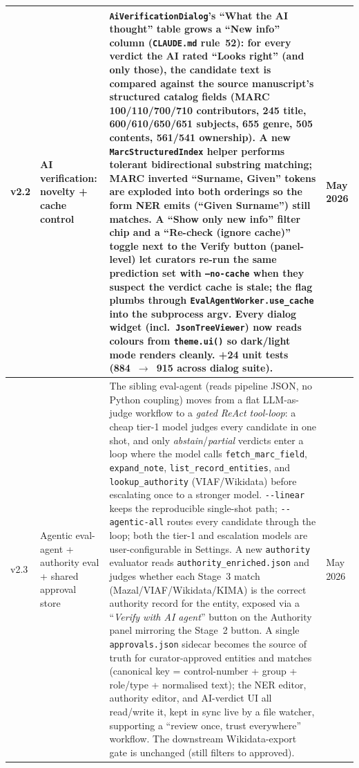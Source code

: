 \documentclass[12pt]{article}
\newcommand{\filepath}[1]{\texttt{\small #1}}
\newcommand{\code}[1]{\texttt{#1}}
\begin{document}
\begin{longtable}{|l|l|p{5cm}|l|}
\hline
v2.2 & AI verification: novelty + cache control & \code{AiVerificationDialog}'s ``What the AI thought'' table grows a ``\textbf{New info}'' column (\filepath{CLAUDE.md} rule~52): for every verdict the AI rated ``Looks right'' (and only those), the candidate text is compared against the source manuscript's structured catalog fields (MARC 100/110/700/710 contributors, 245 title, 600/610/650/651 subjects, 655 genre, 505 contents, 561/541 ownership). A new \code{MarcStructuredIndex} helper performs tolerant bidirectional substring matching; MARC inverted ``Surname, Given'' tokens are exploded into both orderings so the form NER emits (``Given Surname'') still matches. A ``Show only new info'' filter chip and a ``\textbf{Re-check (ignore cache)}'' toggle next to the Verify button (panel-level) let curators re-run the same prediction set with \code{--no-cache} when they suspect the verdict cache is stale; the flag plumbs through \code{EvalAgentWorker.use\_cache} into the subprocess argv. Every dialog widget (incl.\ \code{JsonTreeViewer}) now reads colours from \code{theme.ui()} so dark/light mode renders cleanly. +24 unit tests (884~$\to$~915 across dialog suite). & May 2026 \\
\hline
v2.3 & Agentic eval-agent + authority eval + shared approval store & The sibling eval-agent (reads pipeline JSON, no Python coupling) moves from a flat LLM-as-judge workflow to a \emph{gated ReAct tool-loop}: a cheap tier-1 model judges every candidate in one shot, and only \emph{abstain}/\emph{partial} verdicts enter a loop where the model calls \code{fetch\_marc\_field}, \code{expand\_note}, \code{list\_record\_entities}, and \code{lookup\_authority} (VIAF/Wikidata) before escalating once to a stronger model. \code{-{}-linear} keeps the reproducible single-shot path; \code{-{}-agentic-all} routes every candidate through the loop; both the tier-1 and escalation models are user-configurable in Settings. A new \code{authority} evaluator reads \code{authority\_enriched.json} and judges whether each Stage~3 match (Mazal/VIAF/Wikidata/KIMA) is the correct authority record for the entity, exposed via a ``\emph{Verify with AI agent}'' button on the Authority panel mirroring the Stage~2 button. A single \code{approvals.json} sidecar becomes the source of truth for curator-approved entities and matches (canonical key = control-number + group + role/type + normalised text); the NER editor, authority editor, and AI-verdict UI all read/write it, kept in sync live by a file watcher, supporting a ``review once, trust everywhere'' workflow. The downstream Wikidata-export gate is unchanged (still filters to approved). & May 2026 \\

\end{longtable}
\end{document}
